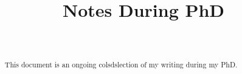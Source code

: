 \documentclass[aos,preprint]{imsart}
\numberwithin{equation}{section}
\begin{document}
\begin{frontmatter}
\title{Notes During PhD}

\begin{aug}
\author[A]{~ }
\address[A]{Centrum Wiskunde \& Informatica, Amsterdam, The Netherlands.}
\end{aug}

\end{frontmatter}


\tableofcontents

\begin{abstract}
    \noindent
    This document is an ongoing colsdslection of my writing during my PhD.
\end{abstract}














\clearpage

\nocite{*}



\end{document}
